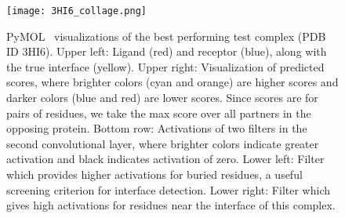 \begin{figure}
	\texttt{[image: 3HI6\_collage.png]}
	\caption{PyMOL~\cite{schrodinger2015} visualizations of the best performing test complex (PDB ID 3HI6). Upper left: Ligand (red) and receptor (blue), along with the true interface (yellow). Upper right: Visualization of predicted scores, where brighter colors (cyan and orange) are higher scores and darker colors (blue and red) are lower scores. Since scores are for pairs of residues, we take the max score over all partners in the opposing protein. Bottom row: Activations of two filters in the second convolutional layer, where brighter colors indicate greater activation and black indicates activation of zero. Lower left: Filter which provides higher activations for buried residues, a useful screening criterion for interface detection. Lower right: Filter which gives high activations for residues near the interface of this complex.
		\label{fig:filter_vis}}
\end{figure}

